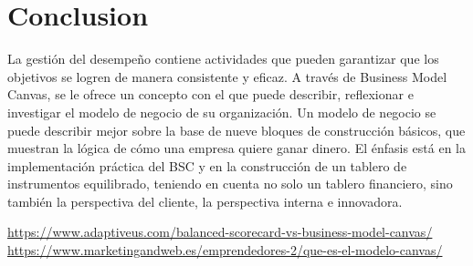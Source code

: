 \documentclass[preprint,12pt]{elsarticle}
\begin{document}
\section{Conclusion}
   La gestión del desempeño contiene actividades que pueden garantizar que los objetivos se logren de manera consistente y eficaz. A través de Business Model Canvas, se le ofrece un concepto con el que puede describir, reflexionar e investigar el modelo de negocio de su organización. Un modelo de negocio se puede describir mejor sobre la base de nueve bloques de construcción básicos, que muestran la lógica de cómo una empresa quiere ganar dinero.
 El énfasis está en la implementación práctica del BSC y en la construcción de un tablero de instrumentos equilibrado, teniendo en cuenta no solo un tablero financiero, sino también la perspectiva del cliente, la perspectiva interna e innovadora. 
          

	
	


	
	
	
	
	
	 \textcolor{blue}{\url{https://www.adaptiveus.com/balanced-scorecard-vs-business-model-canvas/}}
	 \textcolor{blue}{\url{   https://www.marketingandweb.es/emprendedores-2/que-es-el-modelo-canvas/}}

       
	
	
	
	
	
	
	
\end{document}
